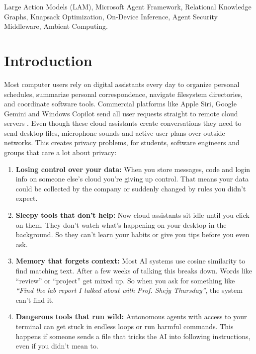 \documentclass[conference,a4paper]{IEEEtran}
\begin{document}
\begin{IEEEkeywords}
Large Action Models (LAM), Microsoft Agent Framework, Relational Knowledge Graphs, Knapsack Optimization, On-Device Inference, Agent Security Middleware, Ambient Computing.
\end{IEEEkeywords}

\section{Introduction}

Most computer users rely on digital assistants every day to organize personal schedules, summarize personal correspondence, navigate filesystem directories, and coordinate software tools. Commercial platforms like Apple Siri, Google Gemini and Windows Copilot send all user requests straight to remote cloud servers \cite{apple2024pcc, google2024geminiprivacy, microsoft2024copilotprivacy}. Even though these cloud assistants create conversations they need to send desktop files, microphone sounds and active user plans over outside networks. This creates privacy problems, for students, software engineers and groups that care a lot about privacy:
\begin{enumerate}
    \item \textbf{Losing control over your data:} When you store messages, code and login info on someone else’s cloud you’re giving up control. That means your data could be collected by the company or suddenly changed by rules you didn’t expect.
    \item \textbf{Sleepy tools that don’t help:} Now cloud assistants sit idle until you click on them. They don’t watch what’s happening on your desktop in the background. So they can’t learn your habits or give you tips before you even ask.
    \item \textbf{Memory that forgets context:} Most AI systems use cosine similarity to find matching text. After a few weeks of talking this breaks down. Words like ``review'' or ``project'' get mixed up. So when you ask for something like \textit{``Find the lab report I talked about with Prof. Shejy Thursday''}, the system can’t find it.
    \item \textbf{Dangerous tools that run wild:} Autonomous agents with access to your terminal can get stuck in endless loops or run harmful commands. This happens if someone sends a file that tricks the AI into following instructions, even if you didn’t mean to.
\end{enumerate}
\end{document}
